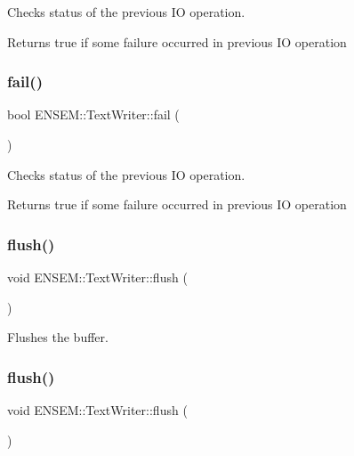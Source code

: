 Checks status of the previous IO operation. 

\begin{DoxyReturn}{Returns}
true if some failure occurred in previous IO operation 
\end{DoxyReturn}
\mbox{\label{classENSEM_1_1TextWriter_a924bbfa5f3bd8f1dbb3f856b1db8b9be}} 
\subsubsection{\texorpdfstring{fail()}{fail()}\hspace{0.1cm}{\footnotesize\ttfamily [3/3]}}
{\footnotesize\ttfamily bool E\+N\+S\+E\+M\+::\+Text\+Writer\+::fail (\begin{DoxyParamCaption}{ }\end{DoxyParamCaption})}



Checks status of the previous IO operation. 

\begin{DoxyReturn}{Returns}
true if some failure occurred in previous IO operation 
\end{DoxyReturn}
\mbox{\label{classENSEM_1_1TextWriter_a6062726c44aa7c500a065a416ae03a67}} 
\subsubsection{\texorpdfstring{flush()}{flush()}\hspace{0.1cm}{\footnotesize\ttfamily [1/3]}}
{\footnotesize\ttfamily void E\+N\+S\+E\+M\+::\+Text\+Writer\+::flush (\begin{DoxyParamCaption}{ }\end{DoxyParamCaption})}



Flushes the buffer. 

\mbox{\label{classENSEM_1_1TextWriter_a6062726c44aa7c500a065a416ae03a67}} 
\subsubsection{\texorpdfstring{flush()}{flush()}\hspace{0.1cm}{\footnotesize\ttfamily [2/3]}}
{\footnotesize\ttfamily void E\+N\+S\+E\+M\+::\+Text\+Writer\+::flush (\begin{DoxyParamCaption}{ }\end{DoxyParamCaption})}



